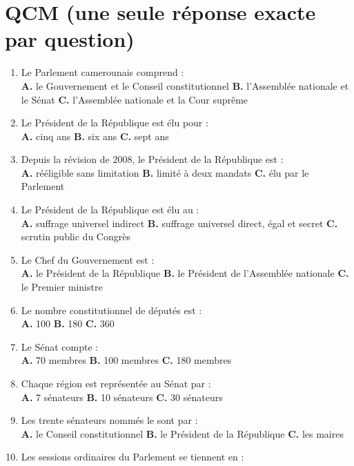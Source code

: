 \documentclass[11pt,a4paper,oneside]{report}
\begin{document}
\section{QCM (une seule réponse exacte par question)}
\begin{enumerate}[label=\textbf{Q\arabic*.},leftmargin=2.4em]
  \item Le Parlement camerounais comprend :\\
  \textbf{A.} le Gouvernement et le Conseil constitutionnel \quad \textbf{B.} l'Assemblée nationale et le Sénat \quad \textbf{C.} l'Assemblée nationale et la Cour suprême
  \item Le Président de la République est élu pour :\\
  \textbf{A.} cinq ans \quad \textbf{B.} six ans \quad \textbf{C.} sept ans
  \item Depuis la révision de 2008, le Président de la République est :\\
  \textbf{A.} rééligible sans limitation \quad \textbf{B.} limité à deux mandats \quad \textbf{C.} élu par le Parlement
  \item Le Président de la République est élu au :\\
  \textbf{A.} suffrage universel indirect \quad \textbf{B.} suffrage universel direct, égal et secret \quad \textbf{C.} scrutin public du Congrès
  \item Le Chef du Gouvernement est :\\
  \textbf{A.} le Président de la République \quad \textbf{B.} le Président de l'Assemblée nationale \quad \textbf{C.} le Premier ministre
  \item Le nombre constitutionnel de députés est :\\
  \textbf{A.} 100 \quad \textbf{B.} 180 \quad \textbf{C.} 360
  \item Le Sénat compte :\\
  \textbf{A.} 70 membres \quad \textbf{B.} 100 membres \quad \textbf{C.} 180 membres
  \item Chaque région est représentée au Sénat par :\\
  \textbf{A.} 7 sénateurs \quad \textbf{B.} 10 sénateurs \quad \textbf{C.} 30 sénateurs
  \item Les trente sénateurs nommés le sont par :\\
  \textbf{A.} le Conseil constitutionnel \quad \textbf{B.} le Président de la République \quad \textbf{C.} les maires
  \item Les sessions ordinaires du Parlement se tiennent en :\\

\end{enumerate}
\end{document}

